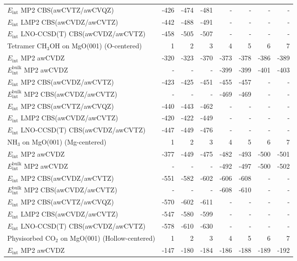 \begin{longtable}{lrrrrrrr}
$E_\textrm{int}$ MP2 CBS(awCVTZ/awCVQZ) & -426 & -474 & -481 & - & - & - & - \\
$E_\textrm{int}$ LMP2 CBS(awCVDZ/awCVTZ) & -442 & -488 & -491 & - & - & - & - \\
$E_\textrm{int}$ LNO-CCSD(T) CBS(awCVDZ/awCVTZ) & -458 & -505 & -507 & - & - & - & - \\
\toprule
Tetramer CH$_3$OH on MgO(001) (O-centered) & 1 & 2 & 3 & 4 & 5 & 6 & 7 \\ 
\midrule
$E_\textrm{int}$ MP2 awCVDZ & -320 & -323 & -370 & -373 & -378 & -386 & -389 \\
$E_\textrm{int}^\textrm{bulk}$ MP2 awCVDZ & - & - & - & -399 & -399 & -401 & -403 \\
$E_\textrm{int}$ MP2 CBS(awCVDZ/awCVTZ) & -423 & -425 & -451 & -455 & -457 & - & - \\
$E_\textrm{int}^\textrm{bulk}$ MP2 CBS(awCVDZ/awCVTZ) & - & - & - & -469 & -469 & - & - \\
$E_\textrm{int}$ MP2 CBS(awCVTZ/awCVQZ) & -440 & -443 & -462 & - & - & - & - \\
$E_\textrm{int}$ LMP2 CBS(awCVDZ/awCVTZ) & -420 & -422 & -449 & - & - & - & - \\
$E_\textrm{int}$ LNO-CCSD(T) CBS(awCVDZ/awCVTZ) & -447 & -449 & -476 & - & - & - & - \\
\toprule
NH$_3$ on MgO(001) (Mg-centered) & 1 & 2 & 3 & 4 & 5 & 6 & 7 \\ 
\midrule
$E_\textrm{int}$ MP2 awCVDZ & -377 & -449 & -475 & -482 & -493 & -500 & -501 \\
$E_\textrm{int}^\textrm{bulk}$ MP2 awCVDZ & - & - & - & -492 & -497 & -500 & -502 \\
$E_\textrm{int}$ MP2 CBS(awCVDZ/awCVTZ) & -551 & -582 & -602 & -606 & -608 & - & - \\
$E_\textrm{int}^\textrm{bulk}$ MP2 CBS(awCVDZ/awCVTZ) & - & - & - & -608 & -610 & - & - \\
$E_\textrm{int}$ MP2 CBS(awCVTZ/awCVQZ) & -570 & -602 & -611 & - & - & - & - \\
$E_\textrm{int}$ LMP2 CBS(awCVDZ/awCVTZ) & -547 & -580 & -599 & - & - & - & - \\
$E_\textrm{int}$ LNO-CCSD(T) CBS(awCVDZ/awCVTZ) & -578 & -610 & -630 & - & - & - & - \\
\toprule
Physisorbed CO$_2$ on MgO(001) (Hollow-centered) & 1 & 2 & 3 & 4 & 5 & 6 & 7 \\ 
\midrule
$E_\textrm{int}$ MP2 awCVDZ & -147 & -180 & -184 & -186 & -188 & -189 & -192 \\

\end{longtable}
